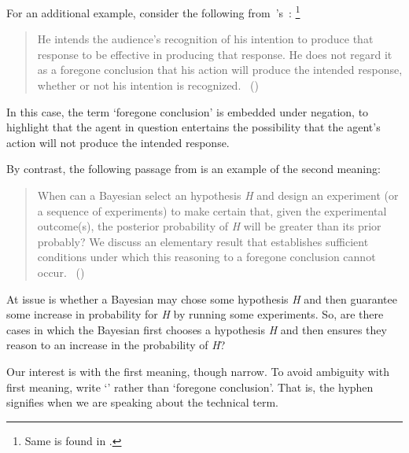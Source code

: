 \begin{note}
  For an additional example, consider the following from~\citeauthor{Grice:1957vg}'s~:%
  \footnote{
    Same is found in \textcite[219]{Grice:1989uf}.
  }
  \begin{quote}
    He intends the audience's recognition of his intention to produce that response to be effective in producing that response.
    He does not regard it as a foregone conclusion that his action will produce the intended response, whether or not his intention is recognized.\newline
    \mbox{ }\hfill\mbox{(\citeyear[385]{Grice:1957vg})}
  \end{quote}

  In this case, the term `foregone conclusion' is embedded under negation, to highlight that the agent in question entertains the possibility that the agent's action will not produce the intended response.

  By contrast, the following passage from \textcite{Kadane:1996vu} is an example of the second meaning:

  \begin{quote}
    When can a Bayesian select an hypothesis \emph{H} and design an experiment (or a sequence of experiments) to make certain that, given the experimental outcome(s), the posterior probability of \emph{H} will be greater than its prior probably?
    We discuss an elementary result that establishes sufficient conditions under which this reasoning to a foregone conclusion cannot occur.%
    \mbox{ }\hfill\mbox{(\citeyear[1228]{Kadane:1996vu})}
  \end{quote}

  At issue is whether a Bayesian may chose some hypothesis \emph{H} and then guarantee some increase in probability for \emph{H} by running some experiments.
  So, are there cases in which the Bayesian first chooses a hypothesis \emph{H} and then ensures they reason to an increase in the probability of \emph{H}?
\end{note}

\begin{note}
  Our interest is with the first meaning, though narrow.
  To avoid ambiguity with first meaning, write `' rather than `foregone conclusion'.
  That is, the hyphen signifies when we are speaking about the technical term.
\end{note}

